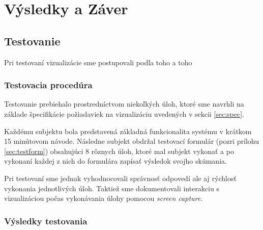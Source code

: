 \chapter{Výsledky a Záver}

\section{Testovanie}
Pri testovaní vizualizácie sme postupovali podľa toho a toho %

\subsection{Testovacia procedúra}
Testovanie prebiehalo prostredníctvom niekoľkých úloh, ktoré sme navrhli na základe špecifikácie požiadaviek na vizualizáciu uvedených v sekcii \ref{sec:spec}. 

Každému subjektu bola predstavená základná funkcionalita systému v krátkom 15 minútovom návode. Následne subjekt obdržal testovací formulár (pozri prílohu \ref{sec:testform}) obsahujúci 8 rôznych úloh, ktoré mal subjekt vykonať a po vykonaní každej z nich do formulára zapísať výsledok svojho skúmania.

Pri testovaní sme jednak vyhodnocovali správnosť odpovedí ale aj rýchlosť vykonania jednotlivých úloh. Taktiež sme dokumentovali interakciu s vizualizáciou počas vykonávania úlohy pomocou \textit{screen capture}.

\subsection{Výsledky testovania}

